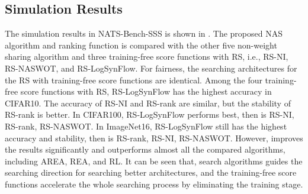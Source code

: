 \documentclass[sigconf]{acmart}
\begin{document}
    \subsection{Simulation Results} %
    The simulation results in NATS-Bench-SSS \cite{Dong_2021} is shown in . 
    The proposed NAS algorithm and ranking function is compared with the other five non-weight sharing 
    algorithm and three training-free score functions with RS, i.e., RS-NI, RS-NASWOT, and 
    RS-LogSynFlow. For fairness, the searching architectures for the RS with training-free 
    score functions are identical. Among the four training-free score functions with RS, RS-LogSynFlow 
    has the highest accuracy in CIFAR10. The accuracy of RS-NI and RS-rank are similar, but the stability 
    of RS-rank is better. In CIFAR100, RS-LogSynFlow performs best, then is RS-NI, RS-rank, RS-NASWOT. 
    In ImageNet16, RS-LogSynFlow still has the highest accuracy and stability, then is RS-rank, RS-NI, 
    RS-NASWOT. 
    However, \palg{} improves the results significantly and outperforms almost all the 
    compared algorithms, including AREA, REA, and RL. It can be seen that, search algorithms guides 
    the searching direction for searching better architectures, and the training-free score functions
    accelerate the whole searching process by eliminating the training stage. 
\end{document}
